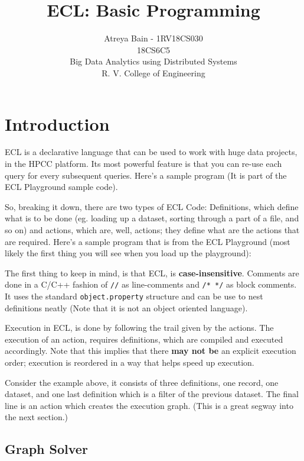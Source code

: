 \documentclass[a4paper,oneside,12pt]{book}
\title{ECL: Basic Programming}
\author{Atreya Bain - 1RV18CS030\\18CS6C5\\Big Data Analytics using Distributed Systems\\R. V. College of Engineering}
\begin{document}
\maketitle{}%
\tableofcontents
\renewcommand{\arraystretch}{1.25}
\pagebreak

\chapter{Introduction}

ECL is a declarative language that can be used to work with huge data projects, in the HPCC platform. Its most powerful feature is that you can re-use each query for every subsequent queries. Here's a sample program (It is part of the ECL Playground sample code).

So, breaking it down, there are two types of ECL Code: Definitions, which define what is to be done (eg. loading up a dataset, sorting through a part of a file, and so on) and actions, which are, well, actions; they define what are the actions that are required. Here's a sample program that is from the ECL Playground (most likely the first thing you will see when you load up the playground):



The first thing to keep in mind, is that ECL, is \textbf{case-insensitive}. Comments are done in a C/C++ fashion of \lstinline!//! as line-comments and \lstinline!/* */! as block comments. It uses the standard \lstinline!object.property! structure and can be use to nest definitions neatly (Note that it is not an object oriented language).

Execution in ECL, is done by following the trail given by the actions. The execution of an action, requires definitions, which are compiled and executed accordingly. Note that this implies that there \textbf{may not be} an explicit execution order; execution is reordered in a way that helps speed up execution.

Consider the example above, it consists of three definitions, one record, one dataset, and one last definition which is a filter of the previous dataset.
The final line is an action which creates the execution graph. (This is a great segway into the next section.)

\section{Graph Solver}
\end{document}
